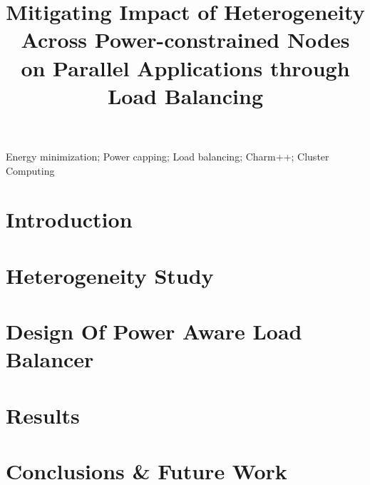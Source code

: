 \documentclass[10pt, conference, compsocconf]{IEEEtran}
\begin{document}
%
\title{ Mitigating Impact of Heterogeneity Across Power-constrained Nodes on
  Parallel Applications through Load Balancing}


\author{
\and
{}
\and
{}
}

\maketitle


\begin{abstract}

\end{abstract}

\begin{IEEEkeywords}
Energy minimization; Power capping; Load balancing; Charm++; Cluster Computing

\end{IEEEkeywords}


\IEEEpeerreviewmaketitle

\section{Introduction}\label{sec:intro}


\section{Heterogeneity Study}\label{sec:heterstudy}


\section{Design Of Power Aware Load Balancer}\label{sec:design}

%

\section{Results} \label{sec:results}


\section{Conclusions \& Future Work} \label{sec:fw}

\end{document}
